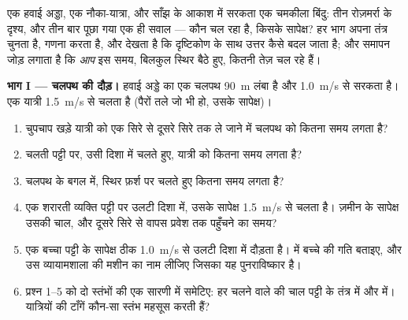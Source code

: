 \begin{problem}
\label{pb:g10:relative-motion:1}
एक हवाई अड्डा, एक नौका-यात्रा, और साँझ के आकाश में सरकता एक चमकीला बिंदु:
तीन रोज़मर्रा के दृश्य, और तीन बार पूछा गया एक ही सवाल --- कौन चल रहा है,
किसके सापेक्ष? हर भाग अपना तंत्र चुनता है, गणना करता है, और देखता है कि
दृष्टिकोण के साथ उत्तर कैसे बदल जाता है; और समापन जोड़ लगाता है कि
\emph{आप} इस समय, बिलकुल स्थिर बैठे हुए, कितनी तेज़ चल रहे हैं।

\medskip
\noindent\textbf{भाग I --- चलपथ की दौड़।}
हवाई अड्डे का एक चलपथ \qty{90}{m} लंबा है और \qty{1.0}{m/s} से सरकता है। एक यात्री
\qty{1.5}{m/s} से चलता है (पैरों तले जो भी हो, उसके सापेक्ष)।
\begin{enumerate}
  \item चुपचाप खड़े यात्री को एक सिरे से दूसरे सिरे तक ले जाने में चलपथ
        को कितना समय लगता है?
  \item चलती पट्टी पर, उसी दिशा में चलते हुए, यात्री को कितना समय लगता
        है?
  \item चलपथ के बगल में, स्थिर फ़र्श पर चलते हुए कितना समय लगता है?
  \item एक शरारती व्यक्ति पट्टी पर उलटी दिशा में, उसके सापेक्ष \qty{1.5}{m/s}
        से चलता है। ज़मीन के सापेक्ष उसकी चाल, और दूसरे सिरे से वापस
        प्रवेश तक पहुँचने का समय?
  \item एक बच्चा पट्टी के सापेक्ष ठीक \qty{1.0}{m/s} से उलटी दिशा में दौड़ता
        है।  में बच्चे की गति बताइए, और उस
        व्यायामशाला की मशीन का नाम लीजिए जिसका यह पुनराविष्कार है।
  \item प्रश्न 1--5 को दो स्तंभों की एक सारणी में समेटिए: हर चलने वाले
        की चाल पट्टी के तंत्र में और  में।
        यात्रियों की टाँगें कौन-सा स्तंभ महसूस करती हैं?
\end{enumerate}


\end{problem}
